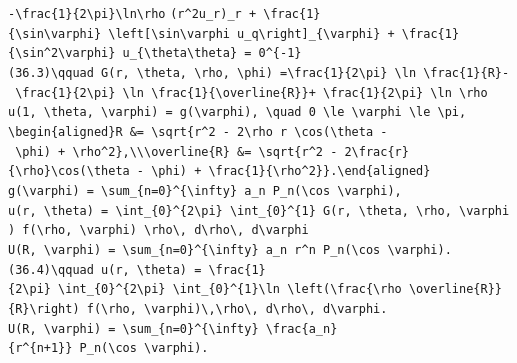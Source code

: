 \documentclass[
  ukrainian,
]{article}
\begin{document}
\texttt{-\textbackslash{}frac\{1\}\{2\textbackslash{}pi\}\textbackslash{}ln\textbackslash{}rho}
\texttt{(r\^{}2u\_r)\_r\ +\ \textbackslash{}frac\{1\}\{\textbackslash{}sin\textbackslash{}varphi\}\ \textbackslash{}left{[}\textbackslash{}sin\textbackslash{}varphi\ u\_q\textbackslash{}right{]}\_\{\textbackslash{}varphi\}\ +\ \textbackslash{}frac\{1\}\{\textbackslash{}sin\^{}2\textbackslash{}varphi\}\ u\_\{\textbackslash{}theta\textbackslash{}theta\}\ =\ 0\^{}\{-1\}}
\texttt{(36.3)\textbackslash{}qquad\ G(r,\ \textbackslash{}theta,\ \textbackslash{}rho,\ \textbackslash{}phi)\ =\textbackslash{}frac\{1\}\{2\textbackslash{}pi\}\ \textbackslash{}ln\ \textbackslash{}frac\{1\}\{R\}-\ \textbackslash{}frac\{1\}\{2\textbackslash{}pi\}\ \textbackslash{}ln\ \textbackslash{}frac\{1\}\{\textbackslash{}overline\{R\}\}+\ \textbackslash{}frac\{1\}\{2\textbackslash{}pi\}\ \textbackslash{}ln\ \textbackslash{}rho}
\texttt{u(1,\ \textbackslash{}theta,\ \textbackslash{}varphi)\ =\ g(\textbackslash{}varphi),\ \textbackslash{}quad\ 0\ \textbackslash{}le\ \textbackslash{}varphi\ \textbackslash{}le\ \textbackslash{}pi,}
\texttt{\textbackslash{}begin\{aligned\}R\ \&=\ \textbackslash{}sqrt\{r\^{}2\ -\ 2\textbackslash{}rho\ r\ \textbackslash{}cos(\textbackslash{}theta\ -\ \textbackslash{}phi)\ +\ \textbackslash{}rho\^{}2\},\textbackslash{}\textbackslash{}\textbackslash{}overline\{R\}\ \&=\ \textbackslash{}sqrt\{r\^{}2\ -\ 2\textbackslash{}frac\{r\}\{\textbackslash{}rho\}\textbackslash{}cos(\textbackslash{}theta\ -\ \textbackslash{}phi)\ +\ \textbackslash{}frac\{1\}\{\textbackslash{}rho\^{}2\}\}.\textbackslash{}end\{aligned\}}
\texttt{g(\textbackslash{}varphi)\ =\ \textbackslash{}sum\_\{n=0\}\^{}\{\textbackslash{}infty\}\ a\_n\ P\_n(\textbackslash{}cos\ \textbackslash{}varphi),}
\texttt{u(r,\ \textbackslash{}theta)\ =\ \textbackslash{}int\_\{0\}\^{}\{2\textbackslash{}pi\}\ \textbackslash{}int\_\{0\}\^{}\{1\}\ G(r,\ \textbackslash{}theta,\ \textbackslash{}rho,\ \textbackslash{}varphi)\ f(\textbackslash{}rho,\ \textbackslash{}varphi)\ \textbackslash{}rho\textbackslash{},\ d\textbackslash{}rho\textbackslash{},\ d\textbackslash{}varphi}
\texttt{U(R,\ \textbackslash{}varphi)\ =\ \textbackslash{}sum\_\{n=0\}\^{}\{\textbackslash{}infty\}\ a\_n\ r\^{}n\ P\_n(\textbackslash{}cos\ \textbackslash{}varphi).}
\texttt{(36.4)\textbackslash{}qquad\ u(r,\ \textbackslash{}theta)\ =\ \textbackslash{}frac\{1\}\{2\textbackslash{}pi\}\ \textbackslash{}int\_\{0\}\^{}\{2\textbackslash{}pi\}\ \textbackslash{}int\_\{0\}\^{}\{1\}\textbackslash{}ln\ \textbackslash{}left(\textbackslash{}frac\{\textbackslash{}rho\ \textbackslash{}overline\{R\}\}\{R\}\textbackslash{}right)\ f(\textbackslash{}rho,\ \textbackslash{}varphi)\textbackslash{},\textbackslash{}rho\textbackslash{},\ d\textbackslash{}rho\textbackslash{},\ d\textbackslash{}varphi.}
\texttt{U(R,\ \textbackslash{}varphi)\ =\ \textbackslash{}sum\_\{n=0\}\^{}\{\textbackslash{}infty\}\ \textbackslash{}frac\{a\_n\}\{r\^{}\{n+1\}\}\ P\_n(\textbackslash{}cos\ \textbackslash{}varphi).}
\end{document}
